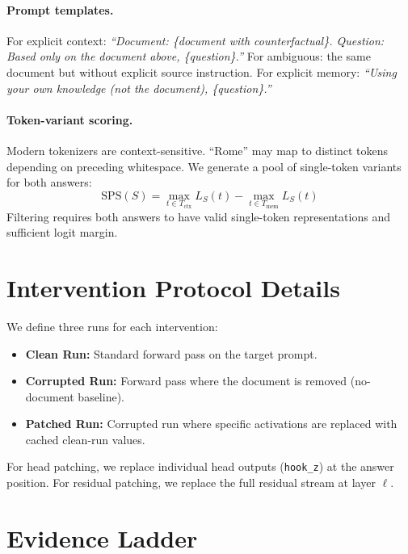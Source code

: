 \documentclass{article}
\begin{document}
\paragraph{Prompt templates.} For explicit context: \textit{``Document: \{document with counterfactual\}. Question: Based only on the document above, \{question\}.''}  For ambiguous: the same document but without explicit source instruction. For explicit memory: \textit{``Using your own knowledge (not the document), \{question\}.''}

\paragraph{Token-variant scoring.} Modern tokenizers are context-sensitive. ``Rome'' may map to distinct tokens depending on preceding whitespace. We generate a pool of single-token variants for both answers:
\begin{equation}
\text{SPS}(S) = \max_{t \in T_{\text{ctx}}} L_S(t) - \max_{t \in T_{\text{mem}}} L_S(t)
\end{equation}
Filtering requires both answers to have valid single-token representations and sufficient logit margin.

\section{Intervention Protocol Details}
\label{app:intervention}

We define three runs for each intervention:
\begin{itemize}
    \item \textbf{Clean Run:} Standard forward pass on the target prompt.
    \item \textbf{Corrupted Run:} Forward pass where the document is removed (no-document baseline).
    \item \textbf{Patched Run:} Corrupted run where specific activations are replaced with cached clean-run values.
\end{itemize}

For head patching, we replace individual head outputs (\texttt{hook\_z}) at the answer position. For residual patching, we replace the full residual stream at layer $\ell$.

\section{Evidence Ladder}
\label{app:evidence}
\end{document}
